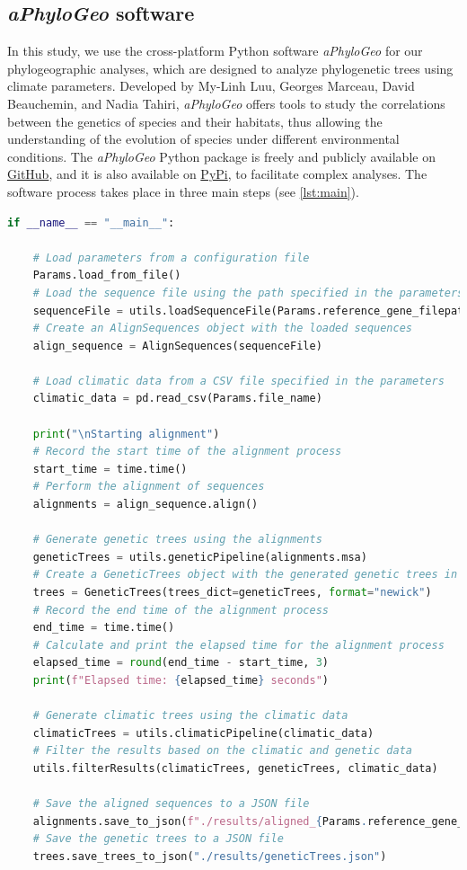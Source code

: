 \subsection{\textit{aPhyloGeo} software}

In this study, we use the cross-platform Python software \textit{aPhyloGeo} for our phylogeographic analyses, which are designed to analyze phylogenetic trees using climate parameters. Developed by My-Linh Luu, Georges Marceau, David Beauchemin, and Nadia Tahiri, \textit{aPhyloGeo} offers tools to study the correlations between the genetics of species and their habitats, thus allowing the understanding of the evolution of species under different environmental conditions. The \textit{aPhyloGeo} Python package is freely and publicly available on \href{https://github.com/tahiri-lab/aPhyloGeo}{GitHub}, and it is also available on \href{https://pypi.org/project/aphylogeo/}{PyPi}, to facilitate complex analyses. The software process takes place in three main steps (see \autoref{lst:main}).

\begin{lstlisting}[label=lst:main,language=Python,caption=Main script for tutorial using the aPhyloGeo package.]
if __name__ == "__main__":

    # Load parameters from a configuration file
    Params.load_from_file()
    # Load the sequence file using the path specified in the parameters
    sequenceFile = utils.loadSequenceFile(Params.reference_gene_filepath)
    # Create an AlignSequences object with the loaded sequences
    align_sequence = AlignSequences(sequenceFile)

    # Load climatic data from a CSV file specified in the parameters
    climatic_data = pd.read_csv(Params.file_name)

    print("\nStarting alignment")
    # Record the start time of the alignment process
    start_time = time.time()
    # Perform the alignment of sequences
    alignments = align_sequence.align()

    # Generate genetic trees using the alignments
    geneticTrees = utils.geneticPipeline(alignments.msa)
    # Create a GeneticTrees object with the generated genetic trees in Newick format
    trees = GeneticTrees(trees_dict=geneticTrees, format="newick")
    # Record the end time of the alignment process
    end_time = time.time()
    # Calculate and print the elapsed time for the alignment process
    elapsed_time = round(end_time - start_time, 3)
    print(f"Elapsed time: {elapsed_time} seconds")

    # Generate climatic trees using the climatic data
    climaticTrees = utils.climaticPipeline(climatic_data)
    # Filter the results based on the climatic and genetic data
    utils.filterResults(climaticTrees, geneticTrees, climatic_data)

    # Save the aligned sequences to a JSON file
    alignments.save_to_json(f"./results/aligned_{Params.reference_gene_file}.json")
    # Save the genetic trees to a JSON file
    trees.save_trees_to_json("./results/geneticTrees.json")
\end{lstlisting}


